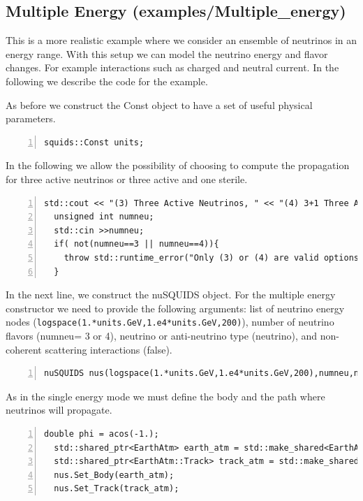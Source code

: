 \documentclass[3p,12pt]{elsarticle}
\newcommand{\ttf}{\ttfamily}
\begin{document}
\subsection{Multiple Energy \textnormal{({\ttf examples/Multiple\_energy})}}
This is a more realistic example where we consider an ensemble of
neutrinos in an energy range. With this setup
we can model the neutrino energy and flavor changes.
For example interactions such as charged and neutral current.
In the following we describe the code for the example.

As before we construct the Const object to have a set of useful physical parameters.
\begin{lstlisting}[frame=leftline, numbers = left,breaklines=true, label = ex:sin1,firstnumber=last]
  squids::Const units;
\end{lstlisting}

In the following we allow the possibility of choosing to compute
the propagation for three active neutrinos or three active and one sterile.

\begin{lstlisting}[frame=leftline, numbers = left,breaklines=true, label = ex:sin1,firstnumber=last]
  std::cout << "(3) Three Active Neutrinos, " << "(4) 3+1 Three Active and One Sterile Neutrino" << std::endl;
  unsigned int numneu;
  std::cin >>numneu;
  if( not(numneu==3 || numneu==4)){
    throw std::runtime_error("Only (3) or (4) are valid options");
  }
\end{lstlisting}

In the next line, we construct the nuSQUIDS object. For the
multiple energy constructor we need to provide the following arguments:
list of neutrino energy nodes
(\lstinline[columns=fixed,breaklines=true]{logspace(1.*units.GeV,1.e4*units.GeV,200)}),
number of neutrino flavors ({\ttf numneu}= 3 or 4), neutrino or
anti-neutrino type ({\ttf neutrino}), and non-coherent scattering
interactions ({\ttf false}). 
\begin{lstlisting}[frame=leftline, numbers = left,breaklines=true,
  label = ex:sin1,firstnumber=last]
  nuSQUIDS nus(logspace(1.*units.GeV,1.e4*units.GeV,200),numneu,neutrino,false);
\end{lstlisting}

As in the single energy mode we must define the body and the path
where neutrinos will propagate.

\begin{lstlisting}[frame=leftline, numbers = left,breaklines=true,
  label = ex:sin1,firstnumber=last]
  double phi = acos(-1.);
  std::shared_ptr<EarthAtm> earth_atm = std::make_shared<EarthAtm>();
  std::shared_ptr<EarthAtm::Track> track_atm = std::make_shared<EarthAtm::Track>(phi);
  nus.Set_Body(earth_atm);
  nus.Set_Track(track_atm);
\end{lstlisting}
\end{document}
